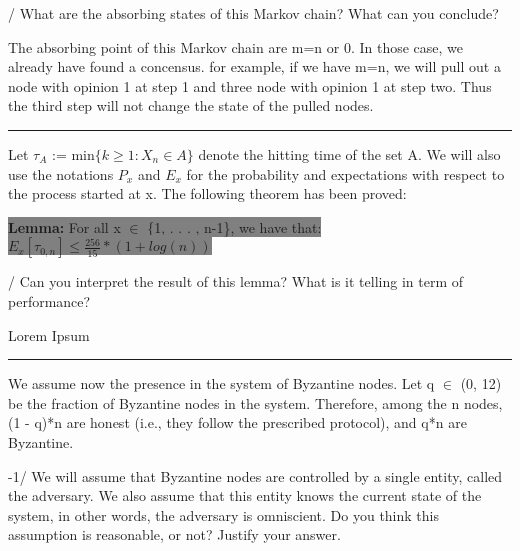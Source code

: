 \documentclass[11pt]{article}
\begin{document}
/ What are the absorbing states of this Markov chain? What can you conclude?

\vspace{5mm}

\noindent The absorbing point of this Markov chain are m=n or 0. In those case, we already have found a concensus. for example, if we have m=n, we will pull out a node with opinion 1 at step 1 and three node with opinion 1 at step two. Thus the third step will not change the state of the pulled nodes.


\begin{center}
    \noindent\rule{8cm}{0.4pt} 
\end{center}


\noindent Let $\tau_{A}$ := min$\{k \geq 1 : X_{n} \in A\}$ denote the hitting time of the set A. We will also use the
notations $P_{x}$ and $E_{x}$ for the probability and expectations with respect to the process started at x. The
following theorem has been proved:
\begin{center}
    \colorbox{Gray}{\textbf{Lemma:} For all x $\in$ \{1, . . . , n-1\}, we have that: $E_{x}[\tau_{0,n}] \leq \frac{256}{15}*(1 + log(n))$}
\end{center}

\vspace{5mm}

/ Can you interpret the result of this lemma? What is it telling in term of performance?

\vspace{5mm}

Lorem Ipsum

\begin{center}
    \noindent\rule{8cm}{0.4pt} 
\end{center}

We assume now the presence in the system of Byzantine nodes. Let q $\in$ (0, 12) be the fraction
of Byzantine nodes in the system. Therefore, among the n nodes, (1 - q)*n are honest (i.e., they follow
the prescribed protocol), and q*n are Byzantine.

\vspace{5mm}

-1/ We will assume that Byzantine nodes are controlled by a single entity, called the adversary. We
also assume that this entity knows the current state of the system, in other words, the adversary
is omniscient. Do you think this assumption is reasonable, or not? Justify your answer. 

\vspace{5mm}
\end{document}
